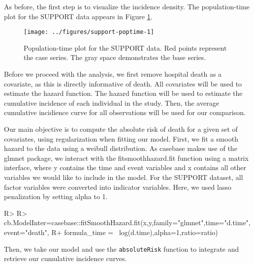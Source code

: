 \documentclass[
]{jss}
\begin{document}
As before, the first step is to visualize the incidence density. The
population-time plot for the SUPPORT data appears in Figure
\ref{fig:support-poptime}.

\begin{CodeChunk}
\begin{figure}

{\centering \texttt{[image: ../figures/support-poptime-1]} 

}

\caption{\label{fig:support-poptime} Population-time plot for the SUPPORT data. Red points represent the case series. The gray space demonstrates the base series.}\label{fig:support-poptime}
\end{figure}
\end{CodeChunk}

Before we proceed with the analysis, we first remove hospital death as a
covariate, as this is directly informative of death. All covariates will
be used to estimate the hazard function. The hazard function will be
used to estimate the cumulative incidence of each individual in the
study. Then, the average cumulative incidience curve for all
observations will be used for our comparison.

Our main objective is to compute the absolute risk of death for a given
set of covariates, using regularization when fitting our model. First,
we fit a smooth hazard to the data using a weibull distribution. As
casebase makes use of the glmnet package, we interact with the
fitsmoothhazard.fit function using a matrix interface, where y contains
the time and event variables and x contains all other variables we would
like to include in the model. For the SUPPORT dataset, all factor
variables were converted into indicator variables. Here, we used lasso
penalization by setting alpha to 1.

\begin{CodeChunk}

\begin{CodeInput}
R> 
R> cb.ModelInter=casebase::fitSmoothHazard.fit(x,y,family="glmnet",time="d.time",event="death",
R+                                        formula_time = ~log(d.time),alpha=1,ratio=ratio)
\end{CodeInput}
\end{CodeChunk}

Then, we take our model and use the \texttt{absoluteRisk} function to
integrate and retrieve our cumulative incidence curves.
\end{document}
